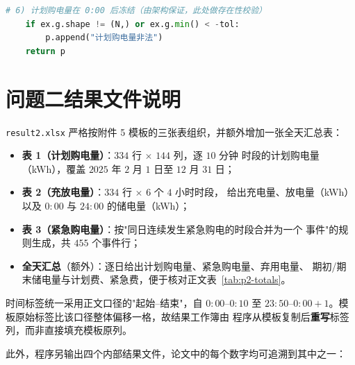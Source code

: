 \documentclass[withoutpreface,bwprint]{cumcmthesis}
\begin{document}
\begin{appendices}
\begin{lstlisting}[language=Python]
    # 6) 计划购电量在 0:00 后冻结（由架构保证，此处做存在性校验）
    if ex.g.shape != (N,) or ex.g.min() < -tol:
        p.append("计划购电量非法")
    return p
\end{lstlisting}

\section{问题二结果文件说明}

\texttt{result2.xlsx} 严格按附件 5 模板的三张表组织，并额外增加一张全天汇总表：

\begin{itemize}
  \item \textbf{表 1（计划购电量）}：$334$ 行 $\times$ $144$ 列，逐 $10$ 分钟
        时段的计划购电量（kWh），覆盖 $2025$ 年 $2$ 月 $1$ 日至 $12$ 月 $31$ 日；
  \item \textbf{表 2（充放电量）}：$334$ 行 $\times$ $6$ 个 $4$ 小时时段，
        给出充电量、放电量（kWh）以及 $0{:}00$ 与 $24{:}00$ 的储电量（kWh）；
  \item \textbf{表 3（紧急购电量）}：按"同日连续发生紧急购电的时段合并为一个
        事件"的规则生成，共 $455$ 个事件行；
  \item \textbf{全天汇总}（额外）：逐日给出计划购电量、紧急购电量、弃用电量、
        期初/期末储电量与计划费、紧急费，便于核对正文表~\ref{tab:p2-totals}。
\end{itemize}

时间标签统一采用正文口径的"起始--结束"，自 $0{:}00$--$0{:}10$ 至
$23{:}50$--$0{:}00{+}1$。模板原始标签比该口径整体偏移一格，故结果工作簿由
程序从模板复制后\textbf{重写}标签列，而非直接填充模板原列。

此外，程序另输出四个内部结果文件，论文中的每个数字均可追溯到其中之一：


\end{appendices}
\end{document}
